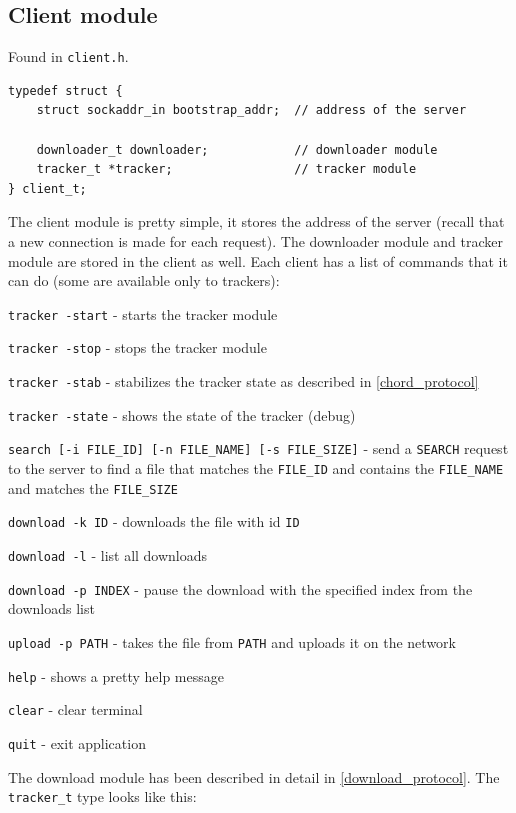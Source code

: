 \documentclass[runningheads]{llncs}
\begin{document}
\subsection{Client module}
Found in \verb|client.h|.
\begin{lstlisting}
typedef struct {
    struct sockaddr_in bootstrap_addr;  // address of the server

    downloader_t downloader;            // downloader module
    tracker_t *tracker;                 // tracker module
} client_t;
\end{lstlisting}
The client module is pretty simple, it stores the address of the server (recall that a new connection is made for each request). The downloader module and tracker module are stored in the client as well. Each client has a list of commands that it can do (some are available only to trackers):
\begin{description}
    \item{\verb|tracker -start|} - starts the tracker module
    \item{\verb|tracker -stop|} - stops the tracker module
    \item{\verb|tracker -stab|} - stabilizes the tracker state as described in \ref{chord_protocol}
    \item{\verb|tracker -state|} - shows the state of the tracker (debug)
    \item{\verb|search [-i FILE_ID] [-n FILE_NAME] [-s FILE_SIZE]|} - send a \verb|SEARCH| request to the server to find a file that matches the \verb|FILE_ID| and contains the \verb|FILE_NAME| and matches the \verb|FILE_SIZE|
    \item{\verb|download -k ID|} - downloads the file with id \verb|ID|
    \item{\verb|download -l|} - list all downloads
    \item{\verb|download -p INDEX|} - pause the download with the specified index from the downloads list
    \item{\verb|upload -p PATH|} - takes the file from \verb|PATH| and uploads it on the network
    \item{\verb|help|} - shows a pretty help message
    \item{\verb|clear|} - clear terminal
    \item{\verb|quit|} - exit application
\end{description}
The download module has been described in detail in \ref{download_protocol}. The \verb|tracker_t| type looks like this:
\end{document}
